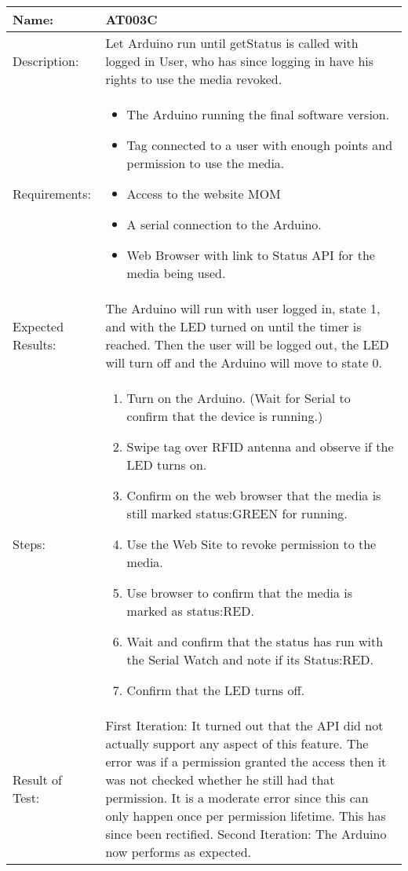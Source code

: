 \begin{table}[h]
	\centering
		\begin{tabular}{|l|p{9cm}|}
		\hline
		\hline
		Name: & AT003C\\
		\hline
		Description: & Let Arduino run until getStatus is called with logged in User, who has since logging in have his rights to use the media revoked.\\
		\hline
		Requirements: & 
		\begin{itemize}
			\item The Arduino running the final software version.
			\item Tag connected to a user with enough points and permission to use the media.
			\item Access to the website MOM
			\item A serial connection to the Arduino.
			\item Web Browser with link to Status API for the media being used.
		\end{itemize}
		\\
		\hline
		Expected Results: & The Arduino will run with user logged in, state 1, and with the LED turned on until the timer is reached. 
		Then the user will be logged out, the LED will turn off and the Arduino will move to state 0.\\
		\hline
		Steps: & 
		\begin{enumerate}
			\item Turn on the Arduino. (Wait for Serial to confirm that the device is running.)
			\item Swipe tag  over RFID antenna and observe if the LED turns on.
			\item Confirm on the web browser that the media is still marked status:GREEN for running.
			\item Use the Web Site to revoke permission to the media.
			\item Use browser to confirm that the media is marked as status:RED.
			\item Wait and confirm that the status has run with the Serial Watch and note if its Status:RED.
			\item Confirm that the LED turns off.
		\end{enumerate}
		\\		
		\hline
		Result of Test: & First Iteration: It turned out that the API did not actually support any aspect of this feature. The error was if a permission granted the access then it was not checked whether he still had that permission. It is a moderate error since this can only happen once per permission lifetime. This has since been rectified. Second Iteration: The Arduino now performs as expected.\\
		\hline
		\end{tabular}
\end{table}

